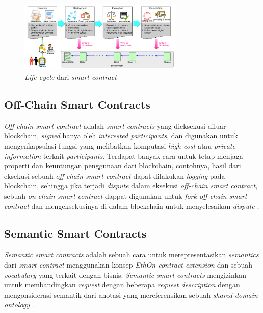 \begin{figure}
	\centering
	\includegraphics[width=0.7\textwidth]{resources/chapter-2/sc-lifecycle.png}
	\caption{\textit{Life cycle} dari \textit{smart contract} \parencite{zheng2020overview}}
	\label{image:sc-lifecycle}
\end{figure}

\subsection{Off-Chain Smart Contracts}
\label{subsec:off-chain-smart-contracts}

\textit{Off-chain smart contract} adalah \textit{smart contracts} yang dieksekusi diluar blockchain, \textit{signed} hanya oleh \textit{interested participants}, dan digunakan untuk mengenkapsulasi fungsi yang melibatkan komputasi \textit{high-cost} atau \textit{private information} terkait \textit{participants}. Terdapat banyak cara untuk tetap menjaga properti dan keuntungan penggunaan dari blockchain, contohnya, hasil dari eksekusi sebuah \textit{off-chain smart contract} dapat dilakukan \textit{logging} pada blockchain, sehingga jika terjadi \textit{dispute} dalam eksekusi \textit{off-chain smart contract}, sebuah \textit{on-chain smart contract} dappat digunakan untuk \textit{fork off-chain smart contract} dan mengeksekusinya di dalam blockchain untuk menyelesaikan \textit{dispute} \parencite{zou2019smart}.

\subsection{Semantic Smart Contracts}
\label{subsec:semantic-smart-contracts}
\textit{Semantic smart contracts} adalah sebuah cara untuk merepresentasikan \textit{semantics} dari \textit{smart contract} menggunakan konsep \textit{EthOn contract extension} dan sebuah \textit{vocabulary} yang terkait dengan bisnis. \textit{Semantic smart contracts} mengizinkan untuk membandingkan \textit{request} dengan beberapa \textit{request description} dengan mengonsiderasi semantik dari anotasi yang mereferensikan sebuah \textit{shared domain ontology} \parencite{baqa2019semantic}.
